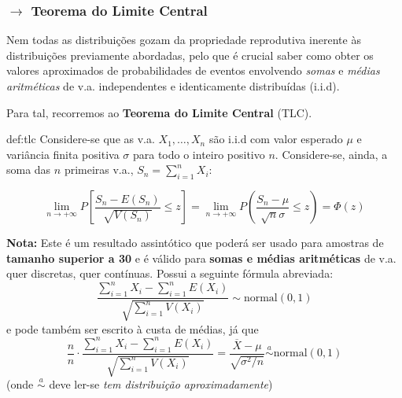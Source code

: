 \newpage
\subsubsection[3.3.2 Teorema do Limite Central]{$\pmb{\rightarrow}$ Teorema do Limite Central}
\noindent Nem todas as distribuições gozam da propriedade reprodutiva inerente às distribuições previamente abordadas, pelo que é crucial saber como obter os valores aproximados de probabilidades de eventos envolvendo \textit{somas} e \textit{médias aritméticas} de v.a. independentes e identicamente distribuídas (i.i.d). 

\vspace{1 em}
\noindent Para tal, recorremos ao \textbf{Teorema do Limite Central} (TLC).

\begin{theo}{def:tlc}\label{def:tlc}
    \noindent Considere-se que as v.a. $X_1, \dots, X_n$ são i.i.d com valor esperado $\mu$ e variância finita positiva $\sigma$ para todo o inteiro positivo $n$. Considere-se, ainda, a soma das $n$ primeiras v.a., $S_n = \sum_{i = 1}^{n} X_i$:

    $$
        \lim_{n \to +\infty} P \left[\dfrac{S_n - E(S_n)}{\sqrt{V(S_n)}} \leq z\right] = \lim_{n \to +\infty} P \left(\dfrac{S_n - \mu}{\sqrt{n}\sigma} \leq z \right) = \Phi(z)
    $$

    \vspace{0.5 em}
    \noindent\textbf{Nota:} Este é um resultado assintótico que poderá ser usado para amostras de \textbf{tamanho superior a 30} e é válido para \textbf{somas e médias aritméticas} de v.a. quer discretas, quer contínuas. Possui a seguinte fórmula abreviada:
    $$
        \dfrac{\sum_{i = 1}^n X_i - \sum_{i = 1}^n E(X_i)}{\sqrt{\sum_{i = 1}^n V(X_i)}} \sim \text{normal}(0,1)
    $$
    \noindent e pode também ser escrito à custa de médias, já que
    $$
        \dfrac{n}{n} \cdot \dfrac{\sum_{i = 1}^n X_i - \sum_{i = 1}^n E(X_i)}{\sqrt{\sum_{i = 1}^n V(X_i)}} = \dfrac{\overline{X} - \mu}{\sqrt{\sigma^2/n}} \overset{a}{\sim} \text{normal}(0,1)
    $$
    \noindent (onde $\overset{a}{\sim}$ deve ler-se \textit{tem distribuição aproximadamente})
\end{theo}


